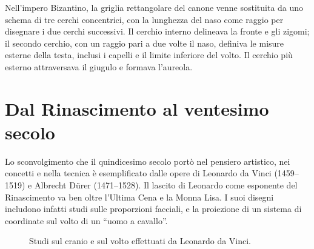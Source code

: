 Nell'impero Bizantino, la griglia rettangolare del canone venne sostituita da uno schema di tre cerchi concentrici, con la lunghezza del naso come raggio per disegnare i due cerchi successivi. Il cerchio interno delineava la fronte e gli zigomi; il secondo cerchio, con un raggio pari a due volte il naso, definiva le misure esterne della testa, inclusi i capelli e il limite inferiore del volto. Il cerchio più esterno attraversava il giugulo e formava l'aureola.

\section{Dal Rinascimento al ventesimo secolo}
Lo sconvolgimento che il quindicesimo secolo portò nel pensiero artistico, nei concetti e nella tecnica è esemplificato dalle opere di Leonardo da Vinci (1459--1519) e Albrecht Dürer (1471--1528). Il lascito di Leonardo come esponente del Rinascimento va ben oltre l'Ultima Cena e la Monna Lisa. I suoi disegni includono infatti studi sulle proporzioni facciali, e la proiezione di un sistema di coordinate sul volto di un ``uomo a cavallo''.

\begin{figure}[h!]
\centering
{} \quad
{}
\caption{Studi sul cranio e sul volto effettuati da Leonardo da Vinci.}
\label{fig:leonardo}
\end{figure}

